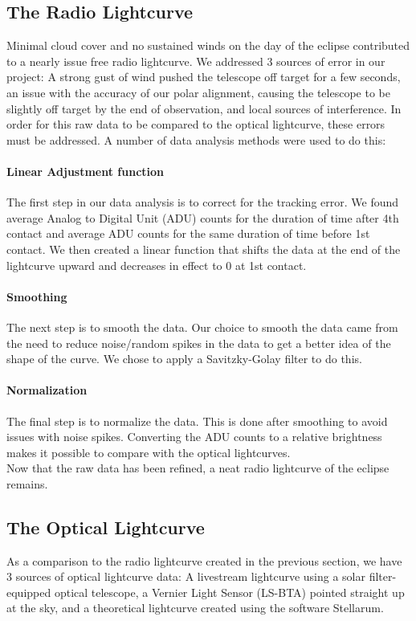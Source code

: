 \subsection{\label{sec:radio}The Radio Lightcurve}
Minimal cloud cover and no sustained winds on the day of the eclipse contributed to a nearly issue free radio lightcurve.
We addressed 3 sources of error in our project: A strong gust of wind pushed the telescope off target for a few seconds, an issue with the accuracy of our polar alignment, causing the telescope to be slightly off target by the end of observation, and local sources of interference.
In order for this raw data to be compared to the optical lightcurve, these errors must be addressed.
A number of data analysis methods were used to do this:
\paragraph{Linear Adjustment function}
The first step in our data analysis is to correct for the tracking error.
We found average Analog to Digital Unit (ADU) counts for the duration of time after 4th contact and average ADU counts for the same duration of time before 1st contact.
We then created a linear function that shifts the data at the end of the lightcurve upward and decreases in effect to 0 at 1st contact.
\paragraph{Smoothing}
The next step is to smooth the data.
Our choice to smooth the data came from the need to reduce noise/random spikes in the data to get a better idea of the shape of the curve.
We chose to apply a Savitzky-Golay filter to do this.
\paragraph{Normalization}
The final step is to normalize the data.
This is done after smoothing to avoid issues with noise spikes.
Converting the ADU counts to a relative brightness makes it possible to compare with the optical lightcurves.
\\
Now that the raw data has been refined, a neat radio lightcurve of the eclipse remains.
\subsection{\label{sec:optical}The Optical Lightcurve}
As a comparison to the radio lightcurve created in the previous section, we have 3 sources of optical lightcurve data: A livestream lightcurve using a solar filter-equipped optical telescope, a Vernier Light Sensor (LS-BTA) pointed straight up at the sky, and a theoretical lightcurve created using the software Stellarum.
